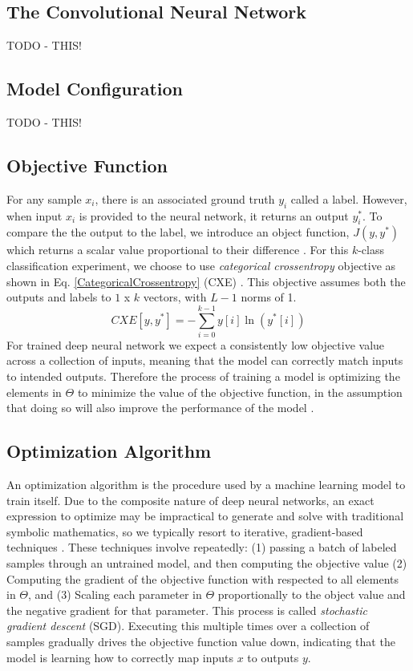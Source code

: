 \documentclass{IEEEtran}
\begin{document}
\subsection{The Convolutional Neural Network}

TODO - THIS!


\subsection{Model Configuration}

TODO - THIS!

\subsection{Objective Function} 
For any sample $x_{i}$, there is an associated ground truth $y_i$ called a label. However, when input $x_i$ is provided to the neural network, it returns an output $y_i^*$. To compare the the output to the label, we introduce an object function, $J(y,y^*)$ which returns a scalar value proportional to their difference \cite{James}. For this $k$-class classification experiment, we choose to use \textit{categorical crossentropy} objective as shown in Eq. \ref{CategoricalCrossentropy} (CXE) \cite{Geron,Virtanen,Tensorflow}. This objective assumes both the outputs and labels to $1$ x $k$ vectors, with $L-1$ norms of 1.
\begin{equation}
    \label{CategoricalCrossentropy}
    {CXE}[y,y^*] = - \sum_{i=0}^{k-1} y[i]\ln(y^*[i])
\end{equation}
For trained deep neural network we expect a consistently low objective value across a collection of inputs, meaning that the model can correctly match inputs to intended outputs. Therefore the process of training a model is optimizing the elements in $\Theta$ to minimize the value of the objective function, in the assumption that doing so will also improve the performance of the model \cite{Goodfellow}.

\subsection{Optimization Algorithm}  
An optimization algorithm is the procedure used by a machine learning model to train itself. Due to the composite nature of deep neural networks, an exact expression to optimize may be impractical to generate and solve with traditional symbolic mathematics, so we typically resort to iterative, gradient-based techniques \cite{Goodfellow, Geron, Loy}. These techniques involve repeatedly: (1) passing a batch of labeled samples through an untrained model, and then computing the objective value (2) Computing the gradient of the objective function with respected to all elements in $\Theta$, and (3) Scaling each parameter in $\Theta$ proportionally to the object value and the negative gradient for that parameter. This process is called \textit{stochastic gradient descent} (SGD). Executing this multiple times over a collection of samples gradually drives the objective function value down, indicating that the model is learning how to correctly map inputs $x$ to outputs $y$.
\end{document}
